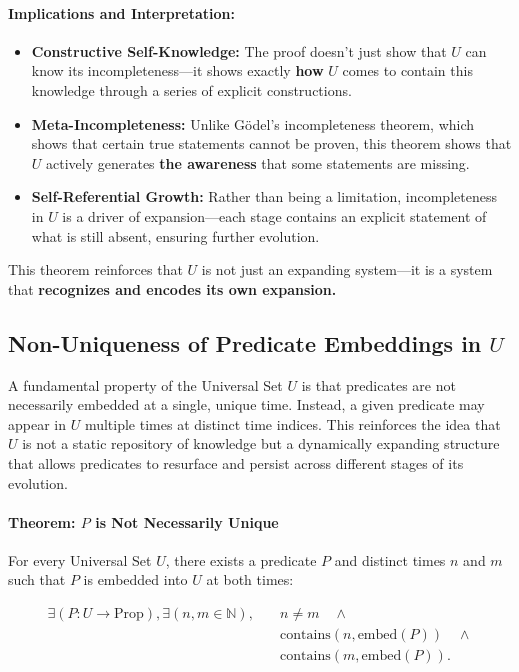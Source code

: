 \documentclass[12pt]{article}
\begin{document}
\paragraph{Implications and Interpretation:}
\begin{itemize}
    \item \textbf{Constructive Self-Knowledge:} The proof doesn't just show that \( U \) can know its incompleteness—it shows exactly \textbf{how} \( U \) comes to contain this knowledge through a series of explicit constructions.
    \item \textbf{Meta-Incompleteness:} Unlike Gödel’s incompleteness theorem, which shows that certain true statements cannot be proven, this theorem shows that \( U \) actively generates \textbf{the awareness} that some statements are missing.
    \item \textbf{Self-Referential Growth:} Rather than being a limitation, incompleteness in \( U \) is a driver of expansion—each stage contains an explicit statement of what is still absent, ensuring further evolution.
\end{itemize}

This theorem reinforces that \( U \) is not just an expanding system—it is a system that \textbf{recognizes and encodes its own expansion.}


\subsection{Non-Uniqueness of Predicate Embeddings in \( U \)}

A fundamental property of the Universal Set \( U \) is that predicates are not necessarily embedded at a single, unique time. Instead, a given predicate may appear in \( U \) multiple times at distinct time indices. This reinforces the idea that \( U \) is not a static repository of knowledge but a dynamically expanding structure that allows predicates to resurface and persist across different stages of its evolution.

\paragraph{Theorem: \( P \) is Not Necessarily Unique}
For every Universal Set \( U \), there exists a predicate \( P \) and distinct times \( n \) and \( m \) such that \( P \) is embedded into \( U \) at both times:

\begin{align}
    \exists (P: U \to \text{Prop}), \exists (n, m \in \mathbb{N}), \quad 
    & n \neq m \quad \wedge \\ 
    & \text{contains}(n, \text{embed}(P)) \quad \wedge \\ 
    & \text{contains}(m, \text{embed}(P)).
\end{align}
\end{document}
